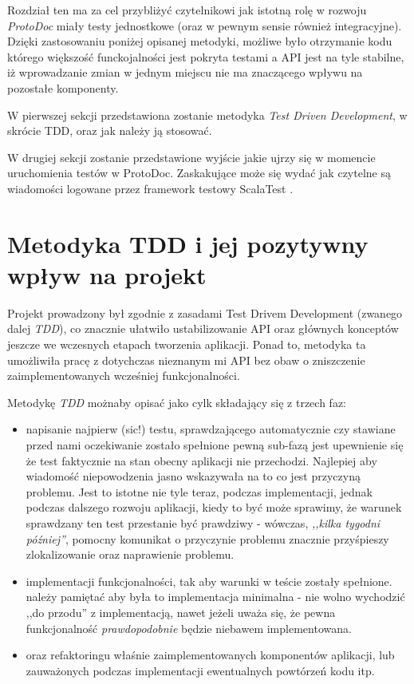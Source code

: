 \documentclass[pdflatex,11pt]{aghdpl}
\begin{document}
Rozdział ten ma za cel przybliżyć czytelnikowi jak istotną rolę w rozwoju \textit{ProtoDoc} miały testy jednostkowe
(oraz w pewnym sensie również integracyjne). Dzięki zastosowaniu poniżej opisanej metodyki, możliwe było otrzymanie
kodu którego większość funckojalności jest pokryta testami a API jest na tyle stabilne, iż wprowadzanie zmian w jednym miejscu
nie ma znaczącego wpływu na pozostałe komponenty.

W pierwszej sekcji przedstawiona zostanie metodyka \textit{Test Driven Development}, w skrócie TDD,
oraz jak należy ją stosować.

W drugiej sekcji zostanie przedstawione wyjście jakie ujrzy się w momencie uruchomienia testów w ProtoDoc.
Zaskakujące może się wydać jak czytelne są wiadomości logowane przez framework testowy ScalaTest \cite{ScalaTest}.

\section{Metodyka TDD i jej pozytywny wpływ na projekt}

Projekt prowadzony był zgodnie z zasadami Test Drivem Development (zwanego dalej \textit{TDD}),
co znacznie ułatwiło ustabilizowanie API oraz głównych konceptów jeszcze we wczesnych etapach tworzenia aplikacji.
Ponad to, metodyka ta umożliwiła pracę z dotychczas nieznanym mi API bez obaw o zniszczenie zaimplementowanych wcześniej funkcjonalności.

Metodykę \textit{TDD} możnaby opisać jako cylk składający się z trzech faz:
\begin{itemize}
 \item napisanie najpierw \small{(sic!)} testu, sprawdzającego automatycznie czy stawiane przed nami oczekiwanie zostało spełnione
 \subitem pewną sub-fazą jest upewnienie się że test faktycznie na stan obecny aplikacji nie przechodzi. Najlepiej aby wiadomość niepowodzenia
          jasno wskazywała na to co jest przyczyną problemu. Jest to istotne nie tyle teraz, podczas implementacji, jednak podczas dalszego rozwoju aplikacji,
          kiedy to być może sprawimy, że warunek sprawdzany ten test przestanie być prawdziwy - wówczas, \textit{,,kilka tygodni później''}, pomocny komunikat o przyczynie problemu 
          znacznie przyśpieszy zlokalizowanie oraz naprawienie problemu.
 \item implementacji funkcjonalności, tak aby warunki w teście zostały spełnione.
  \subitem należy pamiętać aby była to implementacja minimalna - nie wolno wychodzić ,,do przodu'' z implementacją, nawet jeżeli uważa się,
           że pewna funkcjonalność \textit{prawdopodobnie} będzie niebawem implementowana.
 \item oraz refaktoringu właśnie zaimplementowanych komponentów aplikacji, lub zauważonych podczas implementacji ewentualnych powtórzeń kodu itp.
\end{itemize}
\end{document}
